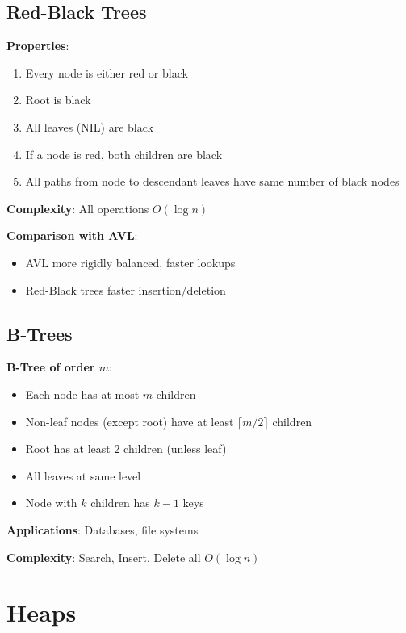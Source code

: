 \documentclass[12pt,a4paper]{report}
\begin{document}
\subsection{Red-Black Trees}
\begin{concept}
\textbf{Properties}:
\begin{enumerate}
    \item Every node is either red or black
    \item Root is black
    \item All leaves (NIL) are black
    \item If a node is red, both children are black
    \item All paths from node to descendant leaves have same number of black nodes
\end{enumerate}

\textbf{Complexity}: All operations $O(\log n)$

\textbf{Comparison with AVL}:
\begin{itemize}
    \item AVL more rigidly balanced, faster lookups
    \item Red-Black trees faster insertion/deletion
\end{itemize}
\end{concept}

\subsection{B-Trees}
\begin{concept}
\textbf{B-Tree of order $m$}:
\begin{itemize}
    \item Each node has at most $m$ children
    \item Non-leaf nodes (except root) have at least $\lceil m/2 \rceil$ children
    \item Root has at least 2 children (unless leaf)
    \item All leaves at same level
    \item Node with $k$ children has $k-1$ keys
\end{itemize}

\textbf{Applications}: Databases, file systems

\textbf{Complexity}: Search, Insert, Delete all $O(\log n)$
\end{concept}

\section{Heaps}
\end{document}
